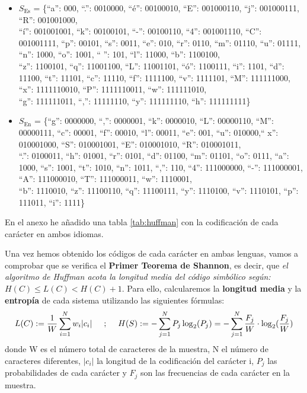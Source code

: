 \documentclass[a4paper]{article}
\begin{document}
\begin{itemize}
\item $S_{\text{Es}}$ = \{``a'': 000, ``.'': 0010000, ``é'': 00100010, ``E'': 001000110, ``j'': 001000111, ``R'': 001001000, \\``í'': 001001001, ``k'': 00100101, ``-'': 00100110, ``4'': 001001110, ``C'': 001001111, ``p'': 00101, ``s'': 0011, ``e'': 010, ``r'': 0110, ``m'': 01110, ``u'': 01111, ``n'': 1000, ``o'': 1001, `` '': 101, ``l'': 11000, ``b'': 1100100, \\``z'': 1100101, ``q'': 11001100, ``L'': 11001101, ``ó'': 1100111, ``i'': 1101, ``d'': 11100, ``t'': 11101, ``c'': 11110, ``f'': 1111100, ``v'': 1111101, ``M'': 111111000, ``x'': 1111110010, ``P'': 1111110011, ``w'': 111111010, \\``g'': 111111011, ``,'': 11111110, ``y'': 111111110, ``h'': 111111111\}

\item $S_{\text{En}}$ = \{``g'': 0000000, ``,'': 0000001, ``k'': 0000010, ``L'': 00000110, ``M'': 00000111, ``c'': 00001, ``f'': 00010, ``l'': 00011, ``e'': 001, ``u'': 010000,`` x'': 010001000, ``S'': 010001001, ``E'': 010001010, ``R'': 010001011, \\ ``.'': 0100011, ``h'': 01001, ``r'': 0101, ``d'': 01100, ``m'': 01101, ``o'': 0111, ``a'': 1000, ``s'': 1001, ``t'': 1010, ``n'': 1011, ``,'': 110, ``4'': 111000000, ``-'': 111000001, ``A'': 111000010, ``T'': 111000011, ``w'': 1110001, \\``b'': 1110010, ``z'': 11100110, ``q'': 11100111, ``y'': 1110100, ``v'': 1110101, ``p'': 111011, ``i'': 1111\}
\end{itemize}

En el anexo he añadido una tabla \ref{tab:huffman} con la codificación de cada carácter en ambos idiomas.

\bigskip

Una vez hemos obtenido los códigos de cada carácter en ambas lenguas, vamos a comprobar que se verifica el \textbf{Primer Teorema de Shannon}, es decir, que \textit{el algoritmo de Huffman acota la longitud media del código simbólico según: $H(C) \leq L(C) < H(C) + 1.$} Para ello, calcularemos la \textbf{longitud media} y la \textbf{entropía} de cada sistema utilizando las siguientes fórmulas: 
\begin{equation} \label{eq:longMed}
L(C):= \frac{1}{W} \sum_{i=1}^{N} w_i |c_i|  \hspace{5mm}\textup{;} \hspace{5mm} H(S) := \ensuremath{-} \sum_{j=1}^N P_j \log_2(P_j) =  \ensuremath{-} \sum_{j=1}^N \frac{F_j}{W} \cdot \log_2(\frac{F_j}{W})
\end{equation}
donde W es el número total de caracteres de la muestra, N el número de caracteres diferentes, $|c_i|$ la longitud de la codificación del carácter i, $P_j$ las probabilidades de cada carácter y $F_j$ son las frecuencias de cada carácter en la  muestra.
\end{document}
